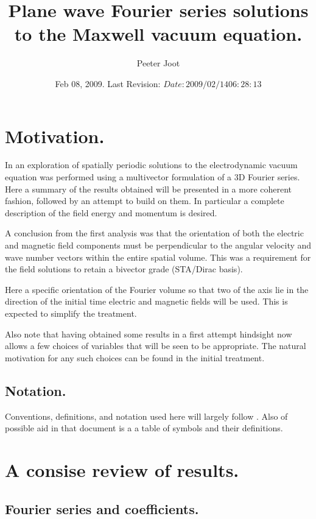\documentclass{article}
\title{ Plane wave Fourier series solutions to the Maxwell vacuum equation. }
\author{Peeter Joot}
\date{ Feb 08, 2009.  Last Revision: $Date: 2009/02/14 06:28:13 $ }
\begin{document}
\maketitle{}
\tableofcontents

\section{ Motivation. }

In \cite{PJFourierVacuum} an exploration of spatially periodic solutions to the electrodynamic vacuum equation was performed using a multivector formulation
of a 3D Fourier series.
Here a summary of the results obtained will be presented in a more
coherent fashion, followed by an attempt to build on them.
In particular a complete
description of the field energy and momentum is desired.

A conclusion from the first analysis was that the
orientation of both the electric and magnetic field components
must be perpendicular to the angular velocity and wave number vectors
within the entire spatial volume.  This was a requirement for the field
solutions to retain a bivector grade (STA/Dirac basis).

Here a specific orientation of the Fourier volume so that two of the axis
lie in the direction of the initial time electric and magnetic fields will be
used.  This is expected to simplify the treatment.

Also note that having obtained some results in a first attempt hindsight
now allows a few choices of variables that will be seen to be appropriate.
The natural motivation for any such choices can be found in the initial
treatment.

\subsection{ Notation. }

Conventions, definitions, and notation used here will largely follow
\cite{PJFourierVacuum}.  Also of possible aid in that document is a
a table of symbols and their definitions.

\section{ A consise review of results. }

\subsection{ Fourier series and coefficients. }
\end{document}

